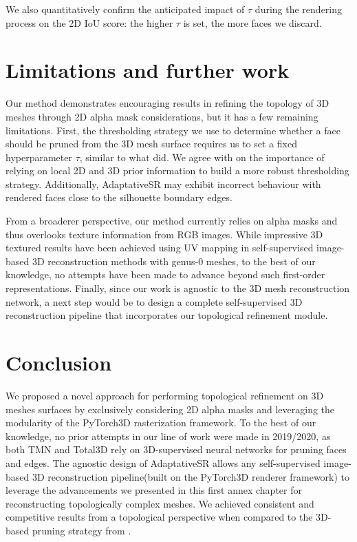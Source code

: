 We also quantitatively confirm the anticipated impact of $\tau$ during the rendering process on the 2D \ac{IoU} score: the higher $\tau$ is set, the more faces we discard. 

\section{Limitations and further work}

Our method demonstrates encouraging results in refining the topology of 3D meshes through 2D alpha mask considerations, but it has a few remaining limitations. First, the thresholding strategy we use to determine whether a face should be pruned from the 3D mesh surface requires us to set a fixed hyperparameter $\tau$, similar to what \citep{pan2019deep} did. We agree with \citep{nie2020total3dunderstanding} on the importance of relying on local 2D and 3D prior information to build a more robust thresholding strategy. Additionally, AdaptativeSR may exhibit incorrect behaviour with rendered faces close to the silhouette boundary edges. 

From a broaderer perspective, our method currently relies on alpha masks and thus overlooks texture information from RGB images. While impressive 3D textured results have been achieved using UV mapping in self-supervised image-based 3D reconstruction methods with genus-0 meshes\citep{li2020self,pavllo2020convolutional}, to the best of our knowledge, no attempts have been made to advance beyond such first-order representations. Finally, since our work is agnostic to the 3D mesh reconstruction network, a next step would be to design a complete self-supervised 3D reconstruction pipeline that incorporates our topological refinement module. 

\section{Conclusion}
\label{sec:conclusion}
We proposed a novel approach for performing topological refinement on 3D meshes surfaces by exclusively considering 2D alpha masks and leveraging the modularity of the PyTorch3D rasterization framework. To the best of our knowledge, no prior attempts in our line of work were made in 2019/2020, as both TMN \citep{pan2019deep} and Total3D \citep{nie2020total3dunderstanding} rely on 3D-supervised neural networks for pruning faces and edges. The agnostic design of AdaptativeSR allows any self-supervised image-based 3D reconstruction pipeline(built on the PyTorch3D renderer framework) to leverage the advancements we presented in this first annex chapter for reconstructing topologically complex meshes. We achieved consistent and competitive results from a topological perspective when compared to the 3D-based pruning strategy from \citep{pan2019deep}. 

